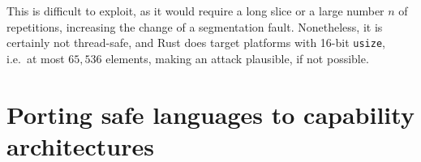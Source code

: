 \documentclass[dissertation.tex]{subfiles}
\begin{document}

This is difficult to exploit, as it would require a long slice or a
large number \(n\) of repetitions, increasing the change of a
segmentation fault.
Nonetheless, it is certainly not thread-safe, and Rust does target
platforms with 16-bit \texttt{usize}, i.e.~at most \(65,536\) elements,
making an attack plausible, if not possible.


\section{Porting safe languages to capability architectures}
\end{document}
